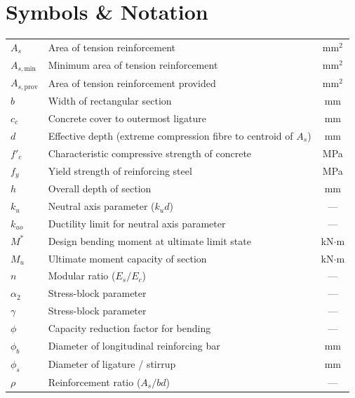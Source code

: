 \section{Symbols \& Notation}
\renewcommand{\arraystretch}{1.15}
\begin{tabularx}{\linewidth}{@{}>{\color{primary}\bfseries}l@{\hspace{8mm}}Xc@{}}
$A_s$      & Area of tension reinforcement                              & mm$^2$ \\
$A_{s,\text{min}}$ & Minimum area of tension reinforcement              & mm$^2$ \\
$A_{s,\text{prov}}$ & Area of tension reinforcement provided            & mm$^2$ \\
$b$        & Width of rectangular section                                & mm \\
$c_c$      & Concrete cover to outermost ligature                         & mm \\
$d$        & Effective depth (extreme compression fibre to centroid of $A_s$) & mm \\
$f'_c$     & Characteristic compressive strength of concrete              & MPa \\
$f_y$      & Yield strength of reinforcing steel                          & MPa \\
$h$        & Overall depth of section                                     & mm \\
$k_u$      & Neutral axis parameter ($k_u d$)                             & --- \\
$k_{uo}$   & Ductility limit for neutral axis parameter                   & --- \\
$M^*$      & Design bending moment at ultimate limit state                & kN$\cdot$m \\
$M_u$      & Ultimate moment capacity of section                          & kN$\cdot$m \\
$n$        & Modular ratio ($E_s/E_c$)                                    & --- \\
$\alpha_2$ & Stress-block parameter                                       & --- \\
$\gamma$   & Stress-block parameter                                       & --- \\
$\phi$     & Capacity reduction factor for bending                        & --- \\
$\phi_b$   & Diameter of longitudinal reinforcing bar                     & mm \\
$\phi_s$   & Diameter of ligature / stirrup                               & mm \\
$\rho$     & Reinforcement ratio ($A_s/bd$)                               & --- \\
\end{tabularx}
\renewcommand{\arraystretch}{1.25}

